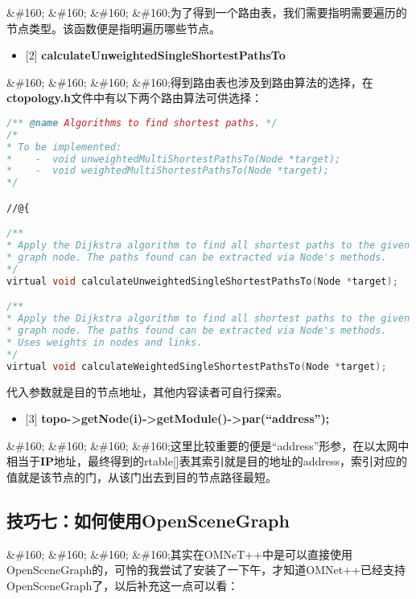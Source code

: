 \&\#160; \&\#160; \&\#160; \&\#160;为了得到一个路由表，我们需要指明需要遍历的节点类型。该函数便是指明遍历哪些节点。

\begin{itemize}
\item {[2]} \textbf{calculateUnweightedSingleShortestPathsTo}

\end{itemize}

\&\#160; \&\#160; \&\#160; \&\#160;得到路由表也涉及到路由算法的选择，在\textbf{ctopology.h}文件中有以下两个路由算法可供选择：

\begin{lstlisting}[language=c]
/** @name Algorithms to find shortest paths. */
/*
* To be implemented:
*    -  void unweightedMultiShortestPathsTo(Node *target);
*    -  void weightedMultiShortestPathsTo(Node *target);
*/

//@{

/**
* Apply the Dijkstra algorithm to find all shortest paths to the given
* graph node. The paths found can be extracted via Node's methods.
*/
virtual void calculateUnweightedSingleShortestPathsTo(Node *target);

/**
* Apply the Dijkstra algorithm to find all shortest paths to the given
* graph node. The paths found can be extracted via Node's methods.
* Uses weights in nodes and links.
*/
virtual void calculateWeightedSingleShortestPathsTo(Node *target);

\end{lstlisting}

代入参数就是目的节点地址，其他内容读者可自行探索。

\begin{itemize}
\item {[3]} \textbf{topo->getNode(i)->getModule()->par(``address'');}

\end{itemize}

\&\#160; \&\#160; \&\#160; \&\#160;这里比较重要的便是“address”形参，在以太网中相当于\textbf{IP}地址，最终得到的rtable{[]}表其索引就是目的地址的address，索引对应的值就是该节点的门，从该门出去到目的节点路径最短。

\subsection{技巧七：如何使用OpenSceneGraph}
\label{技巧七：如何使用openscenegraph}

\&\#160; \&\#160; \&\#160; \&\#160;其实在OMNeT++中是可以直接使用OpenSceneGraph的，可怜的我尝试了安装了一下午，才知道OMNet++已经支持OpenSceneGraph了，以后补充这一点可以看：

